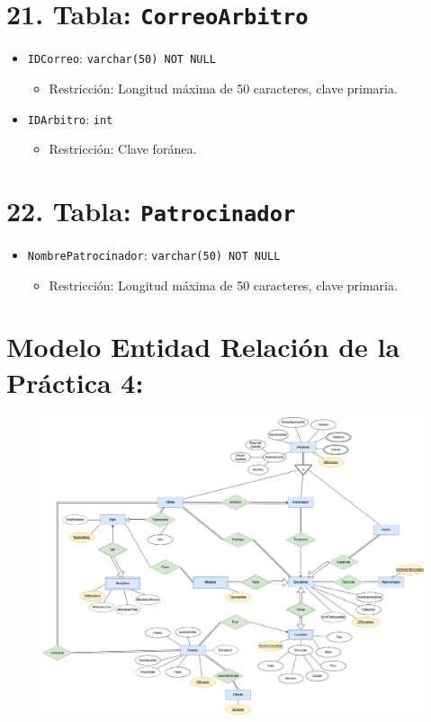 \section*{21. Tabla: \texttt{CorreoArbitro}}
\begin{itemize}
    \item \texttt{IDCorreo}: \texttt{varchar(50) NOT NULL}
    \begin{itemize}
        \item Restricción: Longitud máxima de 50 caracteres, clave primaria.
    \end{itemize}
    \item \texttt{IDArbitro}: \texttt{int}
    \begin{itemize}
        \item Restricción: Clave foránea.
    \end{itemize}
\end{itemize}

\section*{22. Tabla: \texttt{Patrocinador}}
\begin{itemize}
    \item \texttt{NombrePatrocinador}: \texttt{varchar(50) NOT NULL}
    \begin{itemize}
        \item Restricción: Longitud máxima de 50 caracteres, clave primaria.
    \end{itemize}
\end{itemize}


\section{Modelo Entidad Relación de la Práctica 4:}
\begin{figure}[H]
    \centering
    \includegraphics[width=1\textwidth]{resources/ModeloEntidad_Relación.png}

\end{figure}

